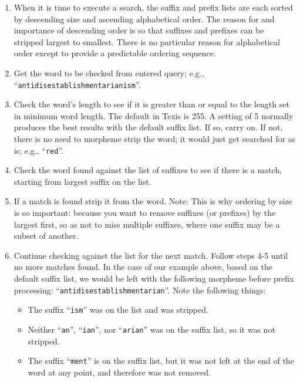 \begin{enumerate}

\item When it is time to execute a search, the suffix and prefix lists
are each sorted by descending size and ascending alphabetical order.
The reason for and importance of descending order is so that suffixes
and prefixes can be stripped largest to smallest.  There is no
particular reason for alphabetical order except to provide a
predictable ordering sequence.

\item Get the word to be checked from entered query; e.g.,
``\verb`antidisestablishmentarianism`''.

\item Check the word's length to see if it is greater than or equal to
the length set in minimum word length.  The default in Texis is 255.  A
setting of 5 normally produces the best results with the default suffix
list.  If so, carry
on.  If not, there is no need to morpheme strip the word; it would
just get searched for as is; e.g., ``\verb`red`''.

\item Check the word found against the list of suffixes to see if
there is a match, starting from largest suffix on the list.

\item If a match is found strip it from the word.  Note:  This is why
ordering by size is so important:  because you want to remove suffixes
(or prefixes) by the largest first, so as not to miss multiple
suffixes, where one suffix may be a subset of another.

\item Continue checking against the list for the next match.  Follow
steps 4-5 until no more matches found.  In the case of our example
above, based on the default suffix list, we would be left with the
following morpheme before prefix processing:
``\verb`antidisestablishmentarian`''.  Note the following things:

\begin{itemize}
\item The suffix ``\verb`ism`'' was on the list and was stripped.

\item Neither ``\verb`an`'', ``\verb`ian`'', nor ``\verb`arian`'' was
on the suffix list, so it was not stripped.

\item The suffix ``\verb`ment`'' is on the suffix list, but it was not
left at the end of the word at any point, and therefore was not
removed.


\end{itemize}
\end{enumerate}
